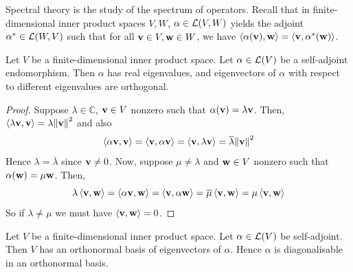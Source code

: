 \documentclass[a4paper,11pt]{article}
\begin{document}
Spectral theory is the study of the spectrum of operators.
Recall that in finite-dimensional inner product spaces \( V, W \), \( \alpha \in {\mathcal{L}}(V, W) \) yields the adjoint \( \alpha^* \in {\mathcal{L}}(W, V) \) such that for all \( {\bf v} \in V, {\bf w} \in W \), we have \( \left\langle{\alpha({\bf v}), {\bf w}}\right\rangle = \left\langle{{\bf v}, \alpha^*({\bf w})}\right\rangle \).
\begin{lemma}
	Let \( V \) be a finite-dimensional inner product space.
	Let \( \alpha \in {\mathcal{L}}(V) \) be a self-adjoint endomorphism.
	Then \( \alpha \) has real eigenvalues, and eigenvectors of \( \alpha \) with respect to different eigenvalues are orthogonal.
\end{lemma}
\begin{proof}
	Suppose \( \lambda \in \mathbb C \), \( {\bf v} \in V \) nonzero such that \( \alpha({\bf v}) = \lambda {\bf v} \).
	Then, \( \left\langle{\lambda {\bf v}, {\bf v}}\right\rangle = \lambda \norm{{\bf v}}^2 \) and also
	\[
		\left\langle{\alpha {\bf v}, {\bf v}}\right\rangle = \left\langle{{\bf v}, \alpha {\bf v}}\right\rangle = \left\langle{{\bf v}, \lambda {\bf v}}\right\rangle = \overline{\lambda} \norm{{\bf v}}^2
	\]
	Hence \( \lambda = \overline{\lambda} \) since \( {\bf v} \neq 0 \).
	Now, suppose \( \mu \neq \lambda \) and \( {\bf w} \in V \) nonzero such that \( \alpha({\bf w}) = \mu {\bf w} \).
	Then,
	\[
		\lambda \left\langle{{\bf v}, {\bf w}}\right\rangle = \left\langle{\alpha {\bf v}, {\bf w}}\right\rangle = \left\langle{{\bf v}, \alpha {\bf w}}\right\rangle = \overline{\mu} \left\langle{{\bf v}, {\bf w}}\right\rangle = \mu \left\langle{{\bf v},{\bf w}}\right\rangle
	\]
	So if \( \lambda \neq \mu \) we must have \( \left\langle{{\bf v},{\bf w}}\right\rangle = 0 \).
\end{proof}
\begin{theorem}
	Let \( V \) be a finite-dimensional inner product space.
	Let \( \alpha \in {\mathcal{L}}(V) \) be self-adjoint.
	Then \( V \) has an orthonormal basis of eigenvectors of \( \alpha \).
	Hence \( \alpha \) is diagonalisable in an orthonormal basis.
\end{theorem}
\end{document}
